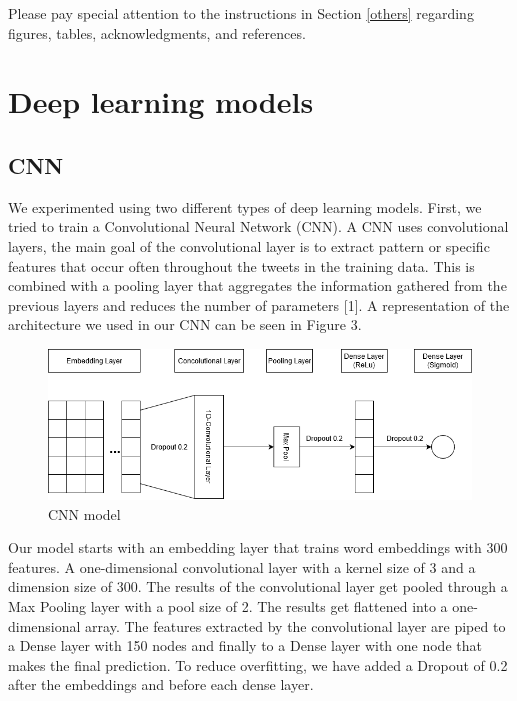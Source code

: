 \documentclass{article}
\begin{document}
Please pay special attention to the instructions in Section \ref{others}
regarding figures, tables, acknowledgments, and references.

\section{Deep learning models}
\subsection{CNN}
We experimented using two different types of deep learning models. First, we
tried to train a Convolutional Neural Network (CNN). A CNN uses convolutional
layers, the main goal of the convolutional layer is to extract pattern or
specific features that occur often throughout the tweets in the training data.
This is combined with a pooling layer that aggregates the information gathered
from the previous layers and reduces the number of parameters [1]. A
representation of the architecture we used in our CNN can be seen in Figure 3.
\begin{figure}[H]
  \centering
  \includegraphics[scale=0.54]{CNN.png}
  \caption{CNN model}
\end{figure}
Our model starts with an embedding layer that trains word embeddings with 300
features. A one-dimensional convolutional layer with a kernel size of 3 and a
dimension size of 300. The results of the convolutional layer get pooled through
a Max Pooling layer with a pool size of 2. The results get flattened into a
one-dimensional array. The features extracted by the convolutional layer are
piped to a Dense layer with 150 nodes and finally to a Dense layer with one node
that makes the final prediction. To reduce overfitting, we have added a Dropout
of 0.2 after the embeddings and before each dense layer.
\end{document}
